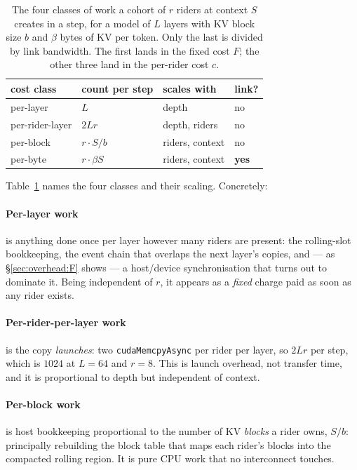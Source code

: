 \begin{table}[t]
\centering
\small
\begin{tabular}{@{}llll@{}}
\toprule
cost class & count per step & scales with & link? \\
\midrule
per-layer        & $L$             & depth           & no \\
per-rider-layer  & $2 L r$         & depth, riders   & no \\
per-block        & $r \cdot S / b$ & riders, context & no \\
per-byte         & $r \cdot \beta S$ & riders, context & \textbf{yes} \\
\bottomrule
\end{tabular}
\caption{The four classes of work a cohort of $r$ riders at context $S$ creates
in a step, for a model of $L$ layers with KV block size $b$ and $\beta$ bytes of
KV per token. Only the last is divided by link bandwidth. The first lands in the
fixed cost $F$; the other three land in the per-rider cost $c$.}
\label{tab:overhead:classes}
\end{table}

Table~\ref{tab:overhead:classes} names the four classes and their scaling.
Concretely:

\paragraph{Per-layer work} is anything done once per layer however many riders
are present: the rolling-slot bookkeeping, the event chain that overlaps the
next layer's copies, and --- as \S\ref{sec:overhead:F} shows --- a
host/device synchronisation that turns out to dominate it. Being independent of
$r$, it appears as a \emph{fixed} charge paid as soon as any rider exists.

\paragraph{Per-rider-per-layer work} is the copy \emph{launches}: two
\texttt{cudaMemcpyAsync} per rider per layer, so $2 L r$ per step, which is
$1024$ at $L{=}64$ and $r{=}8$. This is launch overhead, not transfer time, and
it is proportional to depth but independent of context.

\paragraph{Per-block work} is host bookkeeping proportional to the number of KV
\emph{blocks} a rider owns, $S/b$: principally rebuilding the block table that
maps each rider's blocks into the compacted rolling region. It is pure CPU work
that no interconnect touches.

